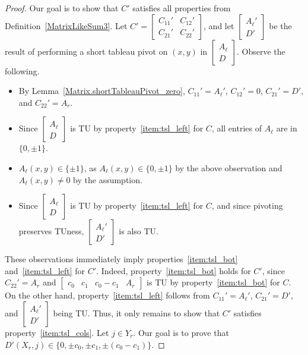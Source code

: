 \begin{proof}
    \leanok
    Our goal is to show that $C'$ satisfies all properties from Definition~\ref{MatrixLikeSum3}. Let $C' = \begin{bmatrix} C_{11}' & C_{12}' \\ C_{21}' & C_{22}' \end{bmatrix}$, and let $\begin{bmatrix} A_{\ell}' \\ D' \end{bmatrix}$ be the result of performing a short tableau pivot on $(x, y)$ in $\begin{bmatrix} A_{\ell} \\ D \end{bmatrix}$. Observe the following.

    \begin{itemize}
        \item By Lemma~\ref{Matrix.shortTableauPivot_zero}, $C_{11}' = A_{\ell}'$, $C_{12}' = 0$, $C_{21}' = D'$, and $C_{22}' = A_{r}$.
        \item Since $\begin{bmatrix} A_{\ell} \\ D \end{bmatrix}$ is TU by property~\ref{item:tsl_left} for $C$, all entries of $A_{\ell}$ are in $\{0, \pm 1\}$.
        \item $A_{\ell} (x, y) \in \{\pm 1\}$, as $A_{\ell} (x, y) \in \{0, \pm 1\}$ by the above observation and $A_{\ell} (x, y) \neq 0$ by the assumption.
        \item Since $\begin{bmatrix} A_{\ell} \\ D \end{bmatrix}$ is TU by property~\ref{item:tsl_left} for $C$, and since pivoting preserves TUness, $\begin{bmatrix} A_{\ell}' \\ D' \end{bmatrix}$ is also TU.
    \end{itemize}

    These observations immediately imply properties~\ref{item:tsl_bot} and~\ref{item:tsl_left} for $C'$. Indeed, property~\ref{item:tsl_bot} holds for $C'$, since $C_{22}' = A_{r}$ and $\begin{bmatrix} c_{0} & c_{1} & c_{0} - c_{1} & A_{r} \end{bmatrix}$ is TU by property~\ref{item:tsl_bot} for $C$. On the other hand, property~\ref{item:tsl_left} follows from $C_{11}' = A_{\ell}'$, $C_{21}' = D'$, and $\begin{bmatrix} A_{\ell}' \\ D' \end{bmatrix}$ being TU. Thus, it only remains to show that $C'$ satisfies property~\ref{item:tsl_cols}. Let $j \in Y_{r}$. Our goal is to prove that $D' (X_{r}, j) \in \{0, \pm c_{0}, \pm c_{1}, \pm (c_{0} - c_{1})\}$.


\end{proof}
